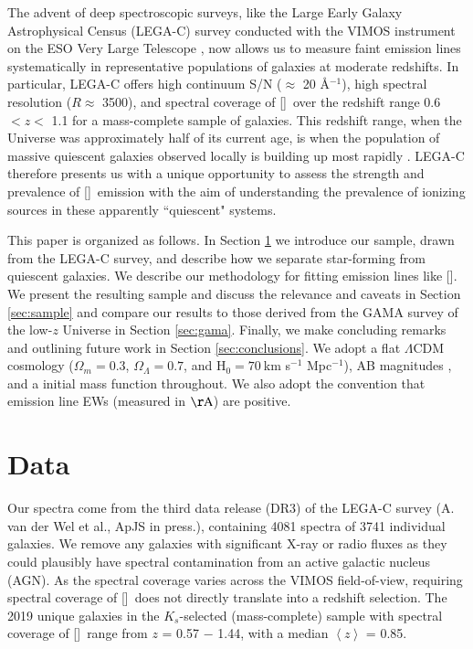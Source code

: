 \documentclass[twocolumn,natbib,iop,hyperref]{aastex62}
\newcommand{\oii}{[\ion{O}{2}]}
\begin{document}
The advent of deep spectroscopic surveys, like the Large Early Galaxy Astrophysical Census (LEGA-C) survey conducted with the VIMOS instrument on the ESO Very Large Telescope \citep{2016ApJS..223...29V}, now allows us to measure faint emission lines systematically in representative populations of galaxies at moderate redshifts.  In particular, LEGA-C offers high continuum S/N ($\approx$ 20 \AA$^{-1}$), high spectral resolution ($R \approx$ 3500), and spectral coverage of \oii\ over the redshift range 0.6 $< z <$ 1.1 for a mass-complete sample of galaxies.  This redshift range, when the Universe was approximately half of its current age, is  when the population of massive quiescent galaxies observed locally is building up most rapidly \citep{2004ApJ...608..752B,2007ApJ...665..265F}.  LEGA-C therefore presents us with a unique opportunity to assess the strength and prevalence of \oii\ emission with the aim of understanding the prevalence of ionizing sources in these apparently ``quiescent" systems.

This paper is organized as follows.  In Section \ref{sec:data} we introduce our sample, drawn from the LEGA-C survey, and describe how we separate star-forming from quiescent galaxies.  We describe our methodology for fitting emission lines like \oii.  We present the resulting sample and discuss the relevance and caveats in Section \ref{sec:sample} and compare our results to those derived from the GAMA survey of the low-$z$ Universe in Section \ref{sec:gama}.  Finally, we make concluding remarks and outlining future work in Section \ref{sec:conclusions}.  We adopt a flat $\Lambda$CDM cosmology ($\Omega_m=0.3$, $\Omega_\Lambda=0.7$, and H$_0=70 ~$km s$^{-1}$ Mpc$^{-1}$), AB magnitudes \citep{1974ApJS...27...21O}, and a \citet{2003PASP..115..763C} initial mass function throughout.  We also adopt the convention that emission line EWs (measured in $\mathrm{\AA}$) are positive.

\section{Data}
\label{sec:data}

Our spectra come from the third data release (DR3) of the LEGA-C survey (A. van der Wel et al., ApJS in press.), containing 4081 spectra of 3741 individual galaxies.  We remove any galaxies with significant X-ray or radio fluxes \citep{2016ApJ...819...62C,2017ApJ...847...72B} as they could plausibly have spectral contamination from an active galactic nucleus (AGN).  As the spectral coverage varies across the VIMOS field-of-view, requiring spectral coverage of \oii\ does not directly translate into a redshift selection.  The 2019 unique galaxies in the $K_s$-selected (mass-complete) sample with spectral coverage of \oii\ range from $z$ = 0.57 $-$ 1.44, with a median $\left<z\right>$ =  0.85.
\end{document}
